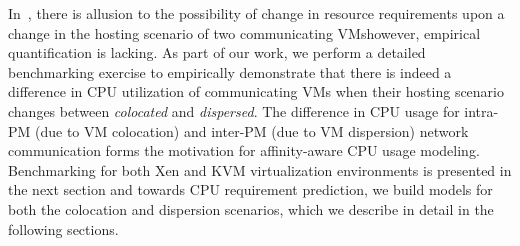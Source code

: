 In~\cite{virtual-putty}, there is allusion to the possibility 
of change in resource requirements upon a change in the
hosting scenario of two communicating VMs\textemdash{}however, 
empirical quantification is lacking. As part of our work,
we perform a detailed benchmarking exercise to empirically 
demonstrate that there is indeed a difference in CPU utilization of
communicating VMs when their hosting scenario changes between
\textit{colocated} and \textit{dispersed}. The difference in CPU usage for
intra-PM (due to VM colocation) and inter-PM (due to VM dispersion)
network communication forms the motivation for
affinity-aware CPU usage modeling.
Benchmarking for both Xen and KVM virtualization environments is presented 
in the next section and 
towards CPU requirement prediction, we build models for both the 
colocation and dispersion scenarios, which we describe in detail 
in the following sections.
